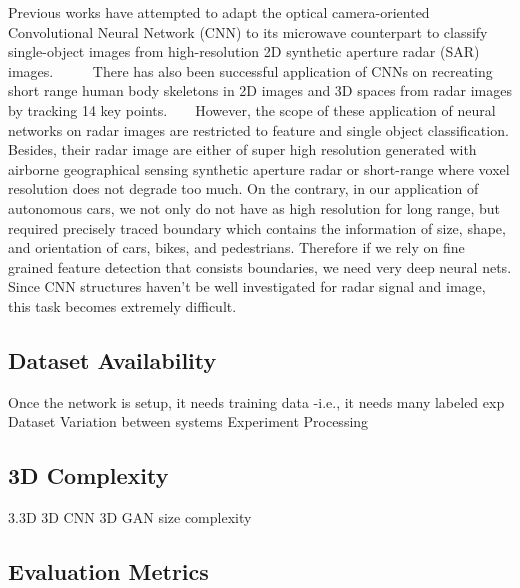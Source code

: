 Previous works have attempted to adapt the optical camera-oriented Convolutional Neural Network (CNN) to its microwave counterpart to classify single-object images from high-resolution 2D synthetic aperture radar (SAR) images. ~\cite{SAR_DL} ~\cite{ship_SAR} ~\cite{change_SAR} There has also been successful application of CNNs on recreating short range human body skeletons in 2D images and 3D spaces from radar images by tracking 14 key points. ~\cite{rfpose} ~\cite{rfpose3D} However, the scope of these application of neural networks on radar images are restricted to feature and single object classification. Besides, their radar image are either of super high resolution generated with airborne geographical sensing synthetic aperture radar or short-range where voxel resolution does not degrade too much. On the contrary, in our application of autonomous cars, we not only do not have as high resolution for long range, but required precisely traced boundary which contains the information of size, shape, and orientation of cars, bikes, and pedestrians. Therefore if we rely on fine grained feature detection that consists boundaries, we need very deep neural nets. Since CNN structures haven't be well investigated for radar signal and image, this task becomes extremely difficult.      

\subsection{Dataset Availability}
Once the network is setup, it needs training data -i.e., it needs many labeled exp
Dataset
	Variation between systems 
	Experiment
	Processing

\subsection{3D Complexity}
3.3D
3D CNN %
3D GAN size complexity


\subsection{Evaluation Metrics}



